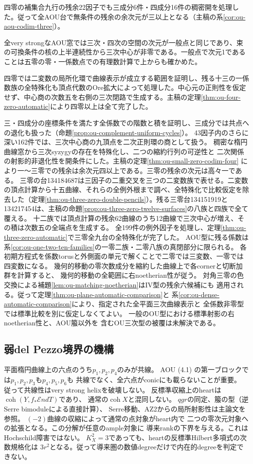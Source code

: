 \documentclass[11pt,a4paper]{ltjsarticle}
\begin{document}
四零の補集合九行の残余22因子でも三成分6件・四成分16件の稠密開を処理した。従って全AOU台で無条件の残余の余次元が三以上となる（主稿の系\ref{cor:ou-aou-codim-three}）。

全very strongなAOU窓では三次・四次の空間の次元が一般点と同じであり、束の可換条件の核の上半連続性から三次中心が非零である。一般点で次元1であることは五零の零・一係数点での有理数計算で上からも確かめた。

四零では二変数の局所化環で曲線表示が成立する範囲を証明し、残る十三の一係数族の全特殊化も頂点代数のOre拡大によって処理した。中心元の正則性を仮定せず、中心商の次数五を右側の三次閉路で生成する。主稿の定理\ref{thm:ou-four-zero-automatic}により四零以上は全て完了した。

三・四成分の座標条件を満たす全係数での階数と積を証明し、三成分では共点への退化も扱った（命題\ref{prop:ou-complement-uniform-cycles}）。
43因子内のさらに深い162件では、三次中心商の九頂点を二次正則環の商として扱う。
稠密な楕円曲線窓から三次syzygyの存在を特殊化し、二つの縮約行列の可逆性と
二次関係の射影的非退化性を開条件にした。主稿の定理\ref{thm:ou-small-zero-codim-four}
により一〜三零での残余は余次元四以上である。三零の残余の次元は高々一である。
三零の台134184687は三因子の二重交叉を三つの二変数族で表せる。二変数の頂点計算から十五曲線、それらの全例外根まで調べ、全特殊化で比較仮定を除去した（定理\ref{thm:ou-three-zero-double-pencils}）。残る三零台134151919と134217454は、主稿の命題\ref{prop:ou-three-zero-twelve-surfaces}の八族と四族で全て覆える。
十二族では頂点計算の残余62曲線のうち12曲線で三次中心が増え、その積は次数五の全端点を生成する。
全199件の例外因子を処理し、定理\ref{thm:ou-three-zero-automatic}で三零全九台の全特殊化が完了した。
AOU型に残る係数は系\ref{cor:ou-one-two-ten-families}の一零二族・二零八族の真閉部分に限られる。
各初期方程式を係数torusと外側面の単元で解くことで二零では三変数、一零では四変数になる。
幾何的移動の零次数成分を縮約した曲線上で各cornerと切断加群を計算すると、
幾何的移動の全範囲に右noetherian性が従う。
対角三零の色交換による補題\ref{lem:ou-matching-noetherian}はIV型の残余六候補にも
適用される。従って定理\ref{thm:ou-plane-automatic-comparison}と
系\ref{cor:ou-dense-automatic-comparison}により、指定された全平面三次曲線表示と
全係数非零型では標準比較を別に仮定しなくてよい。
一般のOU型における標準射影の右noetherian性と、AOU箙以外を
含むOU三次型の被覆は未解決である。

\subsection*{弱del Pezzo境界の機構}
平面楕円曲線上の六点のうち$p_1,p_2,p_4$のみが共線。
AOU (4.1) の第一ブロックでは$p_1,p_2,p_3$も$p_4,p_5,p_6$も
共線でなく、全六点がconicにも載らないことが重要。
従って共線性はvery strong helixを破壊しない。
反標準収縮上のheartは$\operatorname{coh}(Y,f_*\mathcal End T)$であり、
通常の$\operatorname{coh}X$と混同しない。
$qgr$の同定、箙の型（逆Serre bimoduleによる直接計算）、
Serre移動、AZ2からの局所射影性は主論文を参照。
$(-2)$曲線の収縮によって通常の点対象がheart内で
二つの零次元対象への拡張となる。この分解が任意のample対象に
導来rankの下界を与える。これはHochschild障害ではない。
$K_X^2=3$であっても、heartの反標準Hilbert多項式の次数規格化は
$3r^2$となる。従って導来圏の数値degreeだけで内在的degreeを判定できない。
\end{document}
